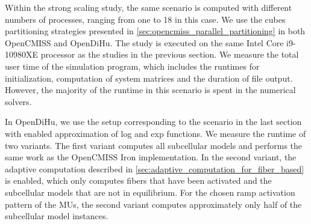 Within the strong scaling study, the same scenario is computed with different numbers of processes, ranging from one to 18 in this case. We use the cubes partitioning strategies presented in \cref{sec:opencmiss_parallel_partitioning} in both OpenCMISS and OpenDiHu.
The study is executed on the same Intel Core i9-10980XE processor as the studies in the previous section.
We measure the total user time of the simulation program, which includes the runtimes for initialization, computation of system matrices and the duration of file output. However, the majority of the runtime in this scenario is spent in the numerical solvers.

In OpenDiHu, we use the setup corresponding to the  scenario in the last section with enabled approximation of log and exp functions. We measure the runtime of two variants. The first variant computes all subcellular models and performs the same work as the OpenCMISS Iron implementation. In the second variant, the adaptive computation described in \cref{sec:adaptive_computation_for_fiber_based} is enabled, which only computes fibers that have been activated and the subcellular models that are not in equilibrium. For the chosen ramp activation pattern of the MUs, the second variant computes approximately only half of the subcellular model instances.

